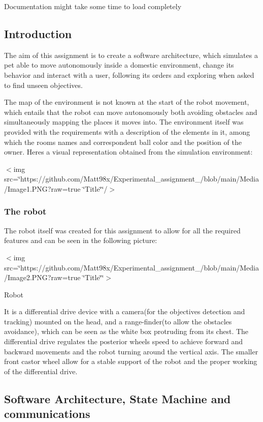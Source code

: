 Documentation might take some time to load completely

\subsection*{Introduction}

The aim of this assignment is to create a software architecture, which simulates a pet able to move autonomously inside a domestic environment, change its behavior and interact with a user, following its orders and exploring when asked to find unseen objectives.

The map of the environment is not known at the start of the robot movement, which entails that the robot can move autonomously both avoiding obstacles and simultaneously mapping the places it moves into. The environment itself was provided with the requirements with a description of the elements in it, among which the rooms names and correspondent ball color and the position of the owner. Here\textquotesingle{}s a visual representation obtained from the simulation environment\+:

$<$img src=\char`\"{}https\+://github.\+com/\+Matt98x/\+Experimental\+\_\+assignment\+\_/blob/main/\+Media/\+Image1.\+P\+N\+G?raw=true \char`\"{}Title\char`\"{}\char`\"{}/$>$

\subsubsection*{The robot}

The robot itself was created for this assignment to allow for all the required features and can be seen in the following picture\+: 

$<$img src=\char`\"{}https\+://github.\+com/\+Matt98x/\+Experimental\+\_\+assignment\+\_/blob/main/\+Media/\+Image2.\+P\+N\+G?raw=true \char`\"{}Title\char`\"{}\char`\"{}$>$ 

Robot 

It is a differential drive device with a camera(for the objectives detection and tracking) mounted on the head, and a range-\/finder(to allow the obstacles avoidance), which can be seen as the white box protruding from its chest. The differential drive regulates the posterior wheels speed to achieve forward and backward movements and the robot turning around the vertical axis. The smaller front castor wheel allow for a stable support of the robot and the proper working of the differential drive.

\subsection*{Software Architecture, State Machine and communications}

